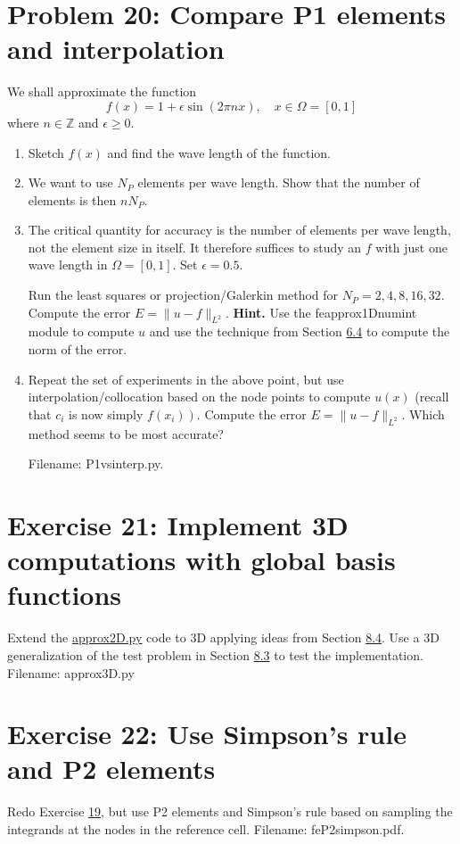 \documentclass[../main.tex]{subfiles}
\begin{document}
	\section*{Problem 20: Compare P1 elements and interpolation}
	\label{sec:sec_10_20}
	\noindent We shall approximate the function
	$$
	f(x)=1+\epsilon \sin (2 \pi n x), \quad x \in \Omega=[0,1]
	$$
	where $n \in \mathbb{Z}$ and $\epsilon \geq 0$.
	\begin{enumerate}[label=(\alph*)]
		\item Sketch $f(x)$ and find the wave length of the function.
		\item We want to use $N_{P}$ elements per wave length. Show that the number of elements is then $n N_{P}$.
		\item The critical quantity for accuracy is the number of elements per wave length, not the element size in itself. It therefore suffices to study an $f$ with just one wave length in $\Omega=[0,1]$. Set $\epsilon=0.5$.
		
		Run the least squares or projection/Galerkin method for $N_{P}=2,4,8,16,32$. Compute the error $E=\|u-f\|_{L^{2}}$.
		\bigbreak
		\textbf{Hint.} Use the fe\textunderscore approx1D\textunderscore numint module to compute $u$ and use the technique from Section \hyperref[sec:sec_6_4]{6.4} to compute the norm of the error.
		\item Repeat the set of experiments in the above point, but use interpolation/collocation based on the node points to compute $u(x)$ (recall that $c_{i}$ is now simply $\left.f\left(x_{i}\right)\right)$. Compute the error $E=\|u-f\|_{L^{2}}$. Which method seems to be most accurate?
		
		Filename: P1\textunderscore vs\textunderscore interp.py.
	\end{enumerate}
	\bigbreak
	\section*{Exercise 21: Implement 3D computations with global basis functions}
	\label{sec:sec_10_21}
	\noindent Extend the \href{http://tinyurl.com/jvzzcfn/fem/approx2D.py}{approx2D.py} code to 3D applying ideas from Section \hyperref[sec:sec_8_4]{8.4}. Use a
	3D generalization of the test problem in Section \hyperref[sec:sec_8_3]{8.3} to test the implementation.
	Filename: approx3D.py
	\bigbreak
	\section*{Exercise 22: Use Simpson's rule and P2 elements}
	\label{sec:sec_10_22}
	\noindent Redo Exercise \hyperref[sec:sec_10_19]{19}, but use P2 elements and Simpson's rule based on sampling
	the integrands at the nodes in the reference cell.
	Filename: fe\textunderscore P2\textunderscore simpson.pdf.

\clearpage
\end{document}
